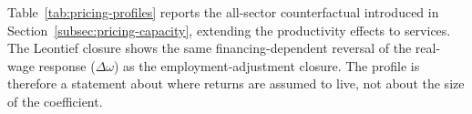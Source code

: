 Table~\ref{tab:pricing-profiles} reports the all-sector counterfactual
introduced in Section~\ref{subsec:pricing-capacity}, extending the productivity
effects to services. The Leontief closure shows the same financing-dependent
reversal of the real-wage response ($\Delta\omega$) as the employment-adjustment closure. The
profile is therefore a statement about where returns are assumed to live, not
about the size of the coefficient.

\clearpage

